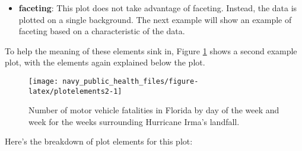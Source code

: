 \documentclass[]{tufte-book}
\begin{document}
\begin{itemize}
{    font, margins, and axis ticks.}
  This plot uses the default \texttt{theme\_gray} theme, with a gray background
  to the main plot area, white gridlines, a Sans Serif font family,
  and a base font size of 11.
  The one customization is that the legend (which here provides the key for
  how color maps to
  day of the week) is shown on the bottom of the plot rather than to the right of
  the plot.
\item
  \textbf{faceting}: This plot does not take advantage of faceting. Instead, the data
  is plotted on a single background. The next example will show an example
  of faceting based on a characteristic of the data.
\end{itemize}

To help the meaning of these elements sink in, Figure \ref{fig:plotelements2}
shows a second example plot, with
the elements again explained below the plot.

\begin{figure}
\texttt{[image: navy\_public\_health\_files/figure-latex/plotelements2-1]} \caption[Number of motor vehicle fatalities in Florida by day of the week and week for the weeks surrounding Hurricane Irma's landfall]{Number of motor vehicle fatalities in Florida by day of the week and week for the weeks surrounding Hurricane Irma's landfall.}\label{fig:plotelements2}
\end{figure}

Here's the breakdown of plot elements for this plot:
\end{document}

